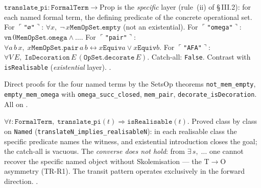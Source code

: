 \begin{definition}
\label{def:translate_pi}
\leanok
{}
$\texttt{translate\_pi} : \texttt{FormalTerm} \to \mathrm{Prop}$ is the
\emph{specific} layer (rule~(ii) of §\,III.2): for each named formal term,
the defining predicate of the concrete operational set.  For
$\ulcorner$\texttt{"∅"}$\urcorner$: $\forall x,\; \lnot\, x
\mathrel{\mathtt{Mem}} \texttt{OpSet.empty}$ (not an existential).  For
$\ulcorner$\texttt{"omega"}$\urcorner$: $\mathtt{vn}\,0 \mathrel{\mathtt{Mem}}
\texttt{OpSet.omega} \land \ldots$.  For $\ulcorner$\texttt{"pair"}$\urcorner$:
$\forall a\,b\,x,\; x \mathrel{\mathtt{Mem}} \texttt{OpSet.pair}\,a\,b
\leftrightarrow x \mathrel{\mathtt{Equiv}} a \lor x \mathrel{\mathtt{Equiv}}
b$.  For $\ulcorner$\texttt{"AFA"}$\urcorner$: $\forall V\,E,\;
\mathtt{IsDecoration}\,E\,(\texttt{OpSet.decorate}\,E)$.  Catch-all:
\texttt{False}.  Contrast with \texttt{isRealisable} (\emph{existential}
layer).  \axiomprofile{[]}.
\end{definition}

\begin{theorem}
\label{thm:translate_pi_base}
\leanok
{}
Direct proofs for the four named terms by the SetsOp theorems
\texttt{not\_mem\_empty}, \texttt{empty\_mem\_omega} with
\texttt{omega\_succ\_closed}, \texttt{mem\_pair},
\texttt{decorate\_isDecoration}.  All on \axiomprofile{[]}.
\end{theorem}

\begin{theorem}
\label{thm:translate_implies_realisable}
\leanok
{}
$\forall t : \texttt{FormalTerm},\;
\texttt{translate\_pi}(t) \Rightarrow \texttt{isRealisable}(t)$.
Proved class by class on \texttt{Named}
(\texttt{translateN\_implies\_realisableN}): in each realisable class the
specific predicate names the witness, and existential introduction closes
the goal; the catch-all is vacuous.  The \emph{converse does not hold}:
from $\exists\, s,\; \ldots$ one cannot recover the specific named object
without Skolemisation --- the T$\to$O asymmetry (TR-R1).  The transit
pattern operates exclusively in the forward direction.  \axiomprofile{[]}.
\end{theorem}


